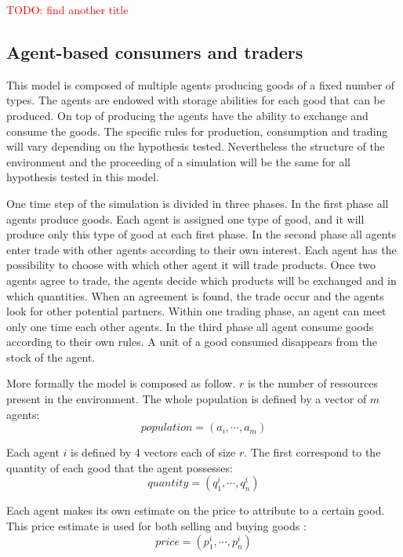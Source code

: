 \documentclass{wscpaperproc}
\newcommand{\memo}[2]{\textcolor{#1}{#2}}
\newcommand{\todo}[1]{\memo{red}{TODO: #1\\}}
\begin{document}
\todo{find another title}
\subsection{Agent-based consumers and traders}

This model is composed of multiple agents producing goods of a fixed number of types. The agents are endowed with storage abilities for each good that can be produced. On top of	producing the agents have the ability to exchange and consume the goods. The specific rules for production, consumption and trading will vary depending on the hypothesis tested. Nevertheless the structure of the environment and the proceeding of a simulation will be the same for all hypothesis tested in this model.

One time step of the simulation is divided in three phases. In the first phase all agents produce goods. Each agent is assigned one type of good, and it will produce only this type of good at each first phase. In the second phase all agents enter trade with other agents according to their own interest. Each agent has the possibility to choose with which other agent it will trade products. Once two agents agree to trade, the agents decide which products will be exchanged and in which quantities. When an agreement is found, the trade occur and the agents look for other potential partners. Within one trading phase, an agent can meet only one time each other agents. In the third phase all agent consume goods according to their own rules. A unit of a good consumed disappears from the stock of the agent.


More formally the model is composed as follow. $r$ is the number of ressources present in the environment. The whole population is defined by a vector of $m$ agents: 
		$$ population = (a_i, \cdots ,a_m) $$
		
Each agent $i$ is defined by 4 vectors each of size $r$. The first correspond to the quantity of each good that the agent possesses: $$ quantity = (q^i_1,\cdots,q^i_n) $$

Each agent makes its own estimate on the price to attribute to a certain good. This price estimate is used for both selling and buying goods :
$$ price = (p^i_1,\cdots,p^i_n) $$
 
\end{document}
